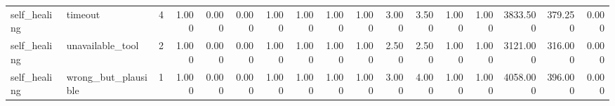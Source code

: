 \begin{tabular}{llrrrrrrrrrrrrrrr}
self_healing & timeout & 4 & 1.000 & 0.000 & 0.000 & 1.000 & 1.000 & 1.000 & 1.000 & 3.000 & 3.500 & 1.000 & 1.000 & 3833.500 & 379.250 & 0.000 \\
self_healing & unavailable_tool & 2 & 1.000 & 0.000 & 0.000 & 1.000 & 1.000 & 1.000 & 1.000 & 2.500 & 2.500 & 1.000 & 1.000 & 3121.000 & 316.000 & 0.000 \\
self_healing & wrong_but_plausible & 1 & 1.000 & 0.000 & 0.000 & 1.000 & 1.000 & 1.000 & 1.000 & 3.000 & 4.000 & 1.000 & 1.000 & 4058.000 & 396.000 & 0.000 \\
\bottomrule
\end{tabular}
